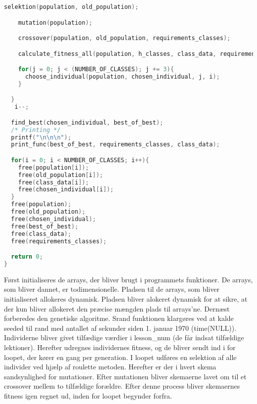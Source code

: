 \begin{lstlisting}[showstringspaces=false,language = c]
    selektion(population, old_population);

    mutation(population);

    crossover(population, old_population, requirements_classes);

    calculate_fitness_all(population, h_classes, class_data, requirements_classes);

    for(j = 0; j < (NUMBER_OF_CLASSES); j += 3){
      choose_individual(population, chosen_individual, j, i);  
    }

  }
   i--;

  find_best(chosen_individual, best_of_best);
  /* Printing */
  printf("\n\n\n");
  print_func(best_of_best, requirements_classes, class_data);

  for(i = 0; i < NUMBER_OF_CLASSES; i++){
    free(population[i]);
    free(old_population[i]);
    free(class_data[i]);
    free(chosen_individual[i]);
  }
  free(population);
  free(old_population);
  free(chosen_individual);
  free(best_of_best);
  free(class_data);
  free(requirements_classes);

  return 0; 
}
\end{lstlisting}

Først initialiseres de arrays, der bliver brugt i programmets funktioner. De arrays, som bliver dannet, er todimensionelle. Pladsen til de arrays, som bliver initialiseret allokeres dynamisk. Pladsen bliver alokeret dynamisk for at sikre, at der kun bliver allokeret den præcise mængden plads til arrays'ne.
Dernæst forberedes den genetiske algoritme. Srand funktionen klargøres ved at kalde seeded til rand med antallet af sekunder siden 1. januar 1970 (time(NULL)). Individerne bliver givet tilfædige værdier i lesson\_num (de får indsat tilfældige lektioner). Herefter udregnes individernes fitness, og de bliver sendt ind i for loopet, der kører en gang per generation. I loopet udføres en selektion af alle individer ved hjælp af roulette metoden. Herefter er der i hvert skema sandsynlighed for mutationer. Efter mutationen bliver skemaerne lavet om til et crossover mellem to tilfældige forældre. Efter denne process bliver skemaernes fitness igen regnet ud, inden for loopet begynder forfra.